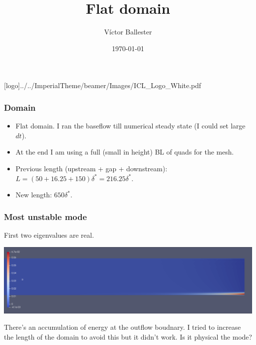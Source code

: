 \documentclass[
	aspectratio=169, %
	t, %
	onlytextwidth, %
	10pt, %
]{beamer}
\title{Flat domain} %
\subtitle{} %
\author{Víctor Ballester} %
\date{\today} %
\def\imagefolder{../../ImperialTheme/beamer/Images}
\begin{document}
\begingroup
{} %
[logo]{\imagefolder/ICL_Logo_White.pdf} %
\frame[plain, s]{\titlepage} %
\endgroup

\begin{frame}
	\frametitle{Domain}
	
	\begin{itemize}
		\item Flat domain. I ran the baseflow till numerical steady state (I could set large $dt$).
		\item At the end I am using a full (small in height) BL of quads for the mesh.
		\item Previous length (upstream + gap + downstream): $L=(50 + 16.25 + 150)\delta^*= 216.25\delta^*$.
		\item New length: $650\delta^*$.
	\end{itemize}
	
	
        
\end{frame}
\begin{frame}
	\frametitle{Most unstable mode}
	First two eigenvalues are real.

	{
	\centering
	\includegraphics[width=\linewidth]{Images/ev.png}
	}

	There's an accumulation of energy at the outflow boudnary. I tried to increase the length of the domain to avoid this but it didn't work. Is it physical the mode?
	
\end{frame}
\end{document}
